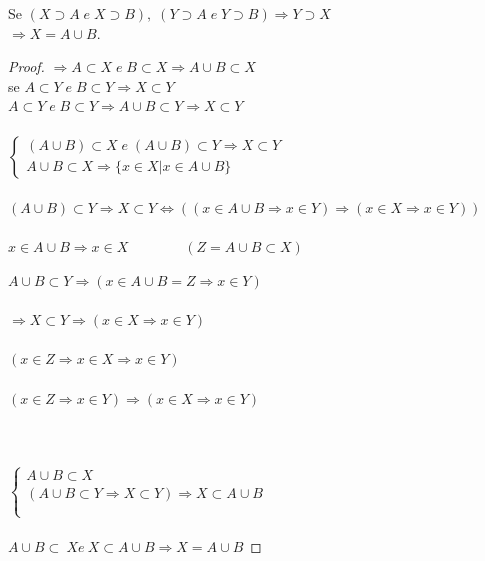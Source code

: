 \text{\maltese } Se $ ( X \supset A \; e \; X \supset B) , \; ( Y \supset A \; e \; Y \supset B)  \Rightarrow Y \supset X $  \\
$ \Rightarrow X = A \cup B  $.
\noindent
\begin{proof}
	$  \Rightarrow A \subset X \; e \; B \subset X \Rightarrow A \cup B \subset X $ \\
	se $ A \subset Y \; e \; B \subset Y \Rightarrow X \subset Y $ \\
	$ A \subset Y \; e \; B \subset Y \Rightarrow A \cup B \subset Y \Rightarrow X \subset Y $ \\ \\
	$
	\begin{cases}
		  (A \cup B ) \subset X \; e \; ( A \cup B ) \subset Y \Rightarrow X \subset Y \\
		  A \cup B \subset X \Rightarrow \{ x \in X | x \in A \cup B \} 
	\end{cases} $ \\ \\

	\noindent
	$ ( A \cup B ) \subset Y \Rightarrow X \subset Y \Leftrightarrow ( ( x \in A \cup B \Rightarrow  x \in Y )  \Rightarrow ( x \in X \Rightarrow x \in Y ) ) $ \\ \\
	$x \in A \cup B \Rightarrow  x \in X   \qquad\qquad	( Z = A \cup B \subset X ) $
	
	\noindent
	$ A \cup B \subset Y \Rightarrow ( x \in A \cup B = Z \Rightarrow x \in Y ) $ \\ \\
	\noindent
	$ \Rightarrow X \subset Y \Rightarrow ( x \in X \Rightarrow x \in Y )$ \\ \\
	$  ( x \in Z \Rightarrow x \in X \Rightarrow x \in Y ) $ \\ \\
	$ ( x \in Z \Rightarrow x \in Y ) \Rightarrow ( x \in X \Rightarrow x \in Y ) $ \\ \\
	
	 \\ \\
	
	$\begin{cases}
		 A \cup B \subset X  \\
		( A \cup B \subset Y \Rightarrow X \subset Y ) \Rightarrow X \subset A \cup B \\ \\
	\end{cases}$\\ \\

	\noindent
	$ A \cup B \subset \ X e \ X \subset A \cup B \Rightarrow X = A \cup B $ 
	
\end{proof}

